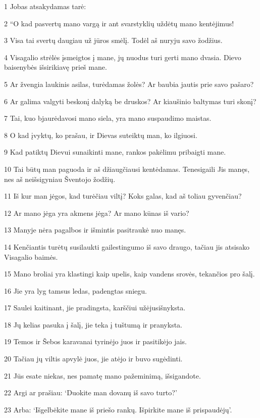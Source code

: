 \par 1 Jobas atsakydamas tarė: 
\par 2 “O kad pasvertų mano vargą ir ant svarstyklių uždėtų mano kentėjimus! 
\par 3 Visa tai svertų daugiau už jūros smėlį. Todėl aš nuryju savo žodžius. 
\par 4 Visagalio strėlės įsmeigtos į mane, jų nuodus turi gerti mano dvasia. Dievo baisenybės išsirikiavę prieš mane. 
\par 5 Ar žvengia laukinis asilas, turėdamas žolės? Ar baubia jautis prie savo pašaro? 
\par 6 Ar galima valgyti beskonį dalyką be druskos? Ar kiaušinio baltymas turi skonį? 
\par 7 Tai, kuo bjaurėdavosi mano siela, yra mano suspaudimo maistas. 
\par 8 O kad įvyktų, ko prašau, ir Dievas suteiktų man, ko ilgiuosi. 
\par 9 Kad patiktų Dievui sunaikinti mane, rankos pakėlimu pribaigti mane. 
\par 10 Tai būtų man paguoda ir aš džiaugčiausi kentėdamas. Tenesigaili Jis manęs, nes aš neišsigyniau Šventojo žodžių. 
\par 11 Iš kur man jėgos, kad turėčiau viltį? Koks galas, kad aš toliau gyvenčiau? 
\par 12 Ar mano jėga yra akmens jėga? Ar mano kūnas iš vario? 
\par 13 Manyje nėra pagalbos ir išmintis pasitraukė nuo manęs. 
\par 14 Kenčiantis turėtų susilaukti gailestingumo iš savo draugo, tačiau jis atsisako Visagalio baimės. 
\par 15 Mano broliai yra klastingi kaip upelis, kaip vandens srovės, tekančios pro šalį. 
\par 16 Jie yra lyg tamsus ledas, padengtas sniegu. 
\par 17 Saulei kaitinant, jie pradingsta, karščiui užėjus­išnyksta. 
\par 18 Jų kelias pasuka į šalį, jie teka į tuštumą ir pranyksta. 
\par 19 Temos ir Šebos karavanai tyrinėjo juos ir pasitikėjo jais. 
\par 20 Tačiau jų viltis apvylė juos, jie atėjo ir buvo sugėdinti. 
\par 21 Jūs esate niekas, nes pamatę mano pažeminimą, išsigandote. 
\par 22 Argi ar prašiau: ‘Duokite man dovanų iš savo turto?’ 
\par 23 Arba: ‘Išgelbėkite mane iš priešo rankų. Išpirkite mane iš prispaudėjų’. 
